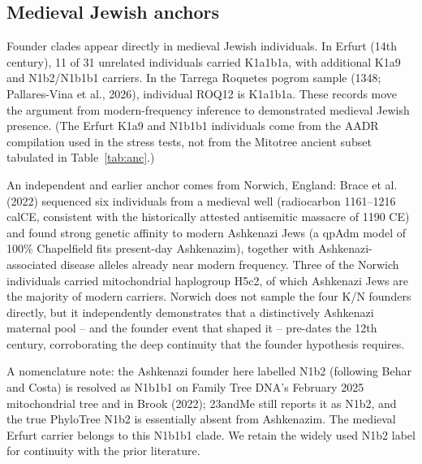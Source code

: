 \documentclass[11pt]{article}
\begin{document}
\subsection{Medieval Jewish anchors}
Founder clades appear directly in medieval Jewish individuals. In Erfurt (14th century), 11 of 31 unrelated individuals carried K1a1b1a, with additional K1a9 and N1b2/N1b1b1 carriers. In the Tarrega Roquetes pogrom sample (1348; Pallares-Vina et al., 2026), individual ROQ12 is K1a1b1a. These records move the argument from modern-frequency inference to demonstrated medieval Jewish presence. (The Erfurt K1a9 and N1b1b1 individuals come from the AADR compilation used in the stress tests, not from the Mitotree ancient subset tabulated in Table~\ref{tab:anc}.)

An independent and earlier anchor comes from Norwich, England: Brace et al. (2022) sequenced six individuals from a medieval well (radiocarbon 1161--1216 calCE, consistent with the historically attested antisemitic massacre of 1190 CE) and found strong genetic affinity to modern Ashkenazi Jews (a qpAdm model of 100\% Chapelfield fits present-day Ashkenazim), together with Ashkenazi-associated disease alleles already near modern frequency. Three of the Norwich individuals carried mitochondrial haplogroup H5c2, of which Ashkenazi Jews are the majority of modern carriers. Norwich does not sample the four K/N founders directly, but it independently demonstrates that a distinctively Ashkenazi maternal pool -- and the founder event that shaped it -- pre-dates the 12th century, corroborating the deep continuity that the founder hypothesis requires.

A nomenclature note: the Ashkenazi founder here labelled N1b2 (following Behar and Costa) is resolved as N1b1b1 on Family Tree DNA's February 2025 mitochondrial tree and in Brook (2022); 23andMe still reports it as N1b2, and the true PhyloTree N1b2 is essentially absent from Ashkenazim. The medieval Erfurt carrier belongs to this N1b1b1 clade. We retain the widely used N1b2 label for continuity with the prior literature.
\end{document}
